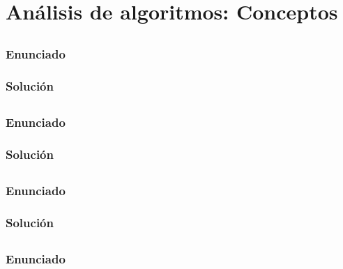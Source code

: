 \section{Análisis de algoritmos: Conceptos}

\subsection{}\label{ej1-1-15}

\subsubsection{Enunciado}

\subsubsection{Solución}

\subsection{}\label{ej1-1-16}

\subsubsection{Enunciado}

\subsubsection{Solución}

\subsection{}\label{ej1-1-17}

\subsubsection{Enunciado}

\subsubsection{Solución}

\subsection{}\label{ej1-1-18}

\subsubsection{Enunciado}

